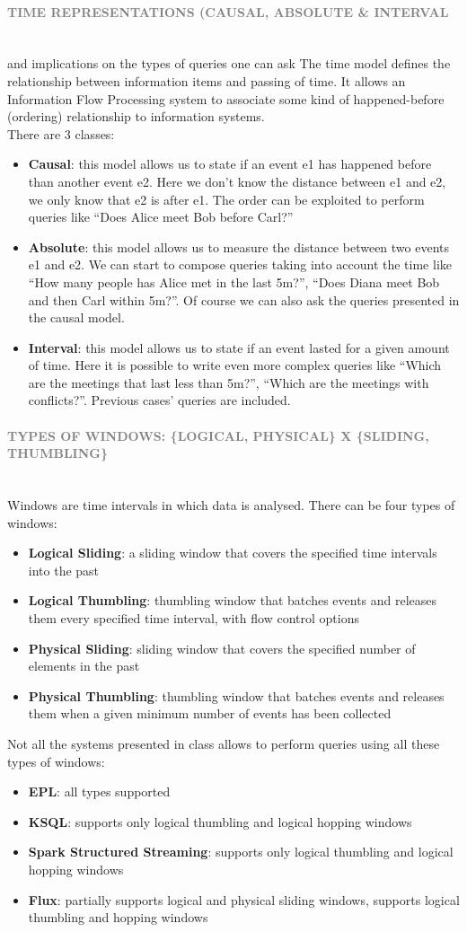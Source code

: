 \documentclass[10pt,a4paper]{article}
\newcommand{\myparagraph}[1]{\paragraph{\normalsize{\textcolor{gray}{\uppercase{\textbf{#1}}}} }\mbox{} \vspace{0.5em}\\}
\begin{document}
\myparagraph{Time representations (Causal, Absolute \& Interval} and implications on the types of queries one can ask
The time model defines the relationship between information items and passing of time. It allows an Information Flow Processing system to associate some kind of happened-before (ordering) relationship to information systems. \\
There are 3 classes:
\begin{itemize}
	\item \textbf{Causal}: this model allows us to state if an event e1 has happened before than another event e2. Here we don’t know the distance between e1 and e2, we only know that e2 is after e1. The order can be exploited to perform queries like “Does Alice meet Bob before Carl?”
	\item \textbf{Absolute}: this model allows us to measure the distance between two events e1 and e2. We can start to compose queries taking into account the time like “How many people has Alice met in the last 5m?”, “Does Diana meet Bob and then Carl within 5m?”. Of course we can also ask the queries presented in the causal model.
	\item \textbf{Interval}: this model allows us to state if an event lasted for a given amount of time. Here it is possible to write even more complex queries like “Which are the meetings that last less than 5m?”, “Which are the meetings with conflicts?”. Previous cases’ queries are included.
\end{itemize}

\myparagraph{Types of windows: \{logical, physical\} x \{sliding, thumbling\}}
		
Windows are time intervals in which data is analysed. 
There can be four types of windows:
\begin{itemize}
	\item \textbf{Logical Sliding}: a sliding window that covers the specified time intervals into the past
	\item \textbf{Logical Thumbling}: thumbling window that batches events and releases them every specified time interval, with flow control options
	\item \textbf{Physical Sliding}: sliding window that covers the specified number of elements in the past
	\item \textbf{Physical Thumbling}: thumbling window that batches events and releases them when a given minimum number of events has been collected
\end{itemize}
Not all the systems presented in class allows to perform queries using all these types of windows:
\begin{itemize}
	\item \textbf{EPL}: all types supported
	\item \textbf{KSQL}: supports only logical thumbling and logical hopping windows
	\item \textbf{Spark Structured Streaming}: supports only logical thumbling and logical hopping windows
	\item \textbf{Flux}: partially supports logical and physical sliding windows, supports logical thumbling and hopping windows
\end{itemize}
\end{document}
